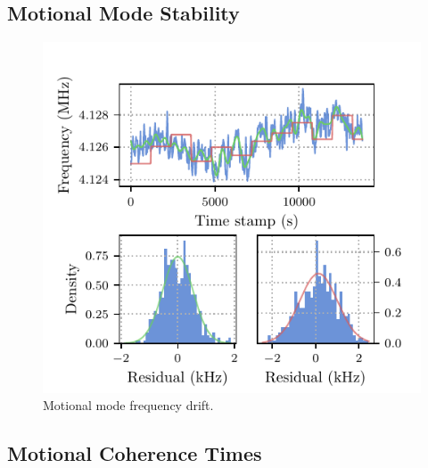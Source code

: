 \subsection{Motional Mode Stability}

    \begin{figure}
        \begin{center}
        \noindent\includegraphics[width=\linewidth]{
            figures/pdf_figure/mode_drift.pdf
            }
        \end{center}
        \caption{
            Motional mode frequency drift.
            }
        \label{fig:mode drift}
    \end{figure}

\subsection{Motional Coherence Times}

